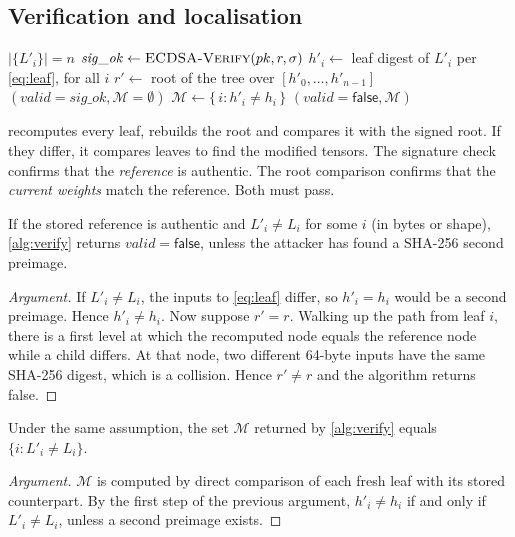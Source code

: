 \subsection{Verification and localisation}

\begin{algorithm}[t]
\caption{\textsc{Verify}$(\{L'_i\}, (r,\sigma,[h_i],n), pk)$}
\label{alg:verify}
\begin{algorithmic}[1]
\Require $|\{L'_i\}| = n$ 
\State $\mathit{sig\_ok} \gets \textsc{ECDSA-Verify}(pk, r, \sigma)$
\State $h'_i \gets$ leaf digest of $L'_i$ per \cref{eq:leaf}, for all $i$
\State $r' \gets$ root of the tree over $[h'_0,\dots,h'_{n-1}]$ 
 \Return $(\mathit{valid}=\mathit{sig\_ok}, \mathcal{M}=\emptyset)$ \EndIf
\State $\mathcal{M} \gets \{\, i : h'_i \neq h_i \,\}$
\State \Return $(\mathit{valid}=\textsf{false}, \mathcal{M})$
\end{algorithmic}
\end{algorithm}

 recomputes every leaf, rebuilds the root and compares it with the signed root.
If they differ, it compares leaves to find the modified tensors. The signature check confirms
that the \emph{reference} is authentic. The root comparison confirms that the \emph{current
weights} match the reference. Both must pass.

\begin{proposition}[Integrity, G1]\label{prop:integrity}
If the stored reference is authentic and $L'_i \neq L_i$ for some $i$ (in bytes or shape),
\cref{alg:verify} returns $\mathit{valid}=\textsf{false}$, unless the attacker has found a
SHA-256 second preimage.
\end{proposition}
\begin{proof}[Argument]
If $L'_i\neq L_i$, the inputs to \cref{eq:leaf} differ, so $h'_i = h_i$ would be a second
preimage. Hence $h'_i\neq h_i$. Now suppose $r'=r$. Walking up the path from leaf $i$, there is a
first level at which the recomputed node equals the reference node while a child differs. At
that node, two different 64-byte inputs have the same SHA-256 digest, which is a collision.
Hence $r'\neq r$ and the algorithm returns \textsf{false}.
\end{proof}

\begin{proposition}\label{prop:localise}
Under the same assumption, the set $\mathcal{M}$ returned by \cref{alg:verify} equals
$\{i : L'_i \neq L_i\}$.
\end{proposition}
\begin{proof}[Argument]
$\mathcal{M}$ is computed by direct comparison of each fresh leaf with its stored counterpart.
By the first step of the previous argument, $h'_i\neq h_i$ if and only if $L'_i\neq L_i$, unless
a second preimage exists.
\end{proof}

